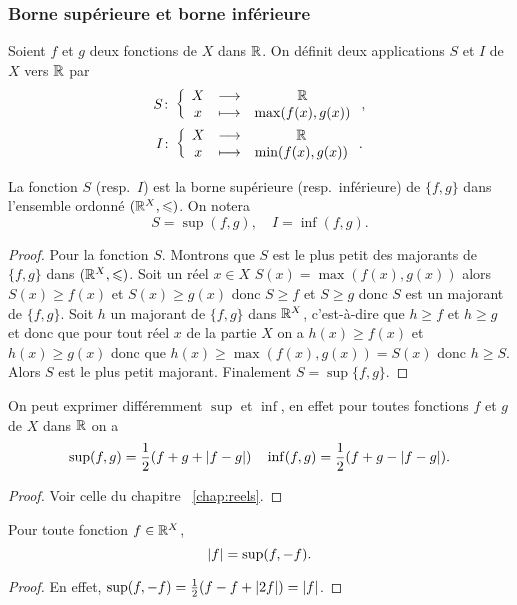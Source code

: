 \subsubsection{Borne supérieure et borne inférieure}
\begin{defdef}
  Soient \(f\) et \(g\) deux fonctions de \(X\) dans \(\mathbb{R}\). On définit deux 
  applications \(S\) et \(I\) de \(X\) vers \(\mathbb{R}\) par
  \begin{gather}
    S\colon \left\{\begin{array}{ccc} X & \longrightarrow &\mathbb{R}\\ x & \longmapsto & \max(f(x),g(x)) \end{array} \right.,\\
    I\colon \left\{\begin{array}{ccc} X & \longrightarrow &\mathbb{R}\\ x & \longmapsto & \min(f(x),g(x)) \end{array} \right..
  \end{gather}
\end{defdef}

\begin{prop}
  La fonction \(S\) (resp.\ \(I\)) est la borne supérieure (resp.\ inférieure) 
  de \(\{f,g\}\) dans l'ensemble ordonné \((\mathbb{R}^X, \leqslant)\). On notera
  \begin{equation}
    S=\sup(f,g), \quad I=\inf(f,g).
  \end{equation}
\end{prop}
\begin{proof}
  Pour la fonction \(S\). Montrons que \(S\) est le plus petit des majorants de 
  \(\{f,g\}\) dans \((\mathbb{R}^X, \leqslant)\). Soit un réel \(x \in X\) 
  \(S(x)=\max(f(x),g(x))\) alors \(S(x) \geqslant f(x)\) et \(S(x) \geqslant 
  g(x)\) donc \(S \geqslant f\) et \(S \geqslant g\) donc \(S\) est un majorant 
  de \(\{f,g\}\). Soit \(h\) un majorant de \(\{f,g\}\) dans \(\mathbb{R}^X\), 
  c'est-à-dire que \(h \geqslant f\) et \(h \geqslant g\) et donc que pour tout 
  réel \(x\) de la partie \(X\) on a \(h(x) \geqslant f(x)\) et \(h(x) \geqslant 
  g(x)\) donc que \(h(x) \geqslant \max(f(x),g(x))=S(x)\) donc \(h \geqslant 
  S\). Alors \(S\) est le plus petit majorant. Finalement \(S=\sup\{f,g\}\).
\end{proof}
\begin{prop}
  On peut exprimer différemment \(\sup\) et \(\inf\), en effet pour toutes 
  fonctions \(f\) et \(g\) de \(X\) dans \(\mathbb{R}\) on a
  \begin{equation}
    \sup(f,g)=\frac{1}{2}(f+g+\left\lvert f-g\right\rvert) \quad 
    \inf(f,g)=\frac{1}{2}(f+g-\left\lvert f-g\right\rvert).
  \end{equation}
\end{prop}
\begin{proof}
  Voir celle du chapitre~
  \ref{chap:reels}.
\end{proof}
\begin{cor}
  Pour toute fonction \(f \in \mathbb{R}^X\),
  \begin{equation}
    \left\lvert f\right\rvert=\sup(f,-f).
  \end{equation}
\end{cor}
\begin{proof}
  En effet, \(\sup(f,-f)=\frac{1}{2}(f-f+\left\lvert2f\right\rvert)=\left\lvert f\right\rvert\).
\end{proof}

